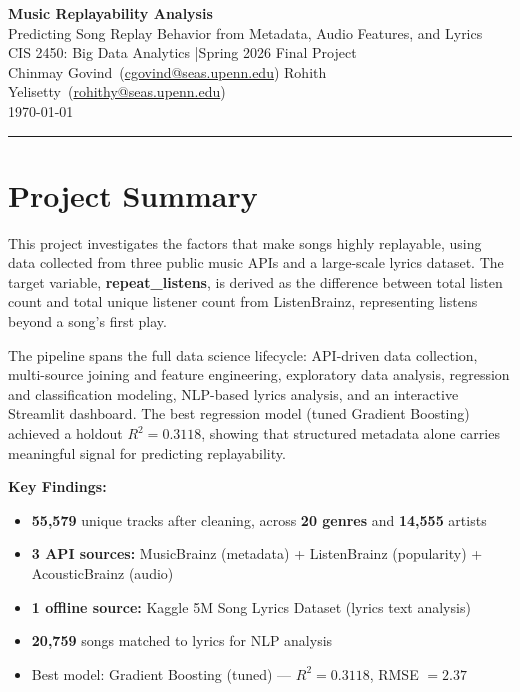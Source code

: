 \documentclass[11pt, letterpaper]{article}
\begin{document}
\begin{center}
    {\LARGE\bfseries\color{accent} Music Replayability Analysis}\\[0.5em]
    {\large Predicting Song Replay Behavior from Metadata, Audio Features, and Lyrics}\\[1em]
    {\normalsize CIS 2450: Big Data Analytics \quad|\quad Spring 2026 Final Project}\\[0.3em]
    {\normalsize Chinmay Govind\ (\href{mailto:cgovind@seas.upenn.edu}{cgovind@seas.upenn.edu}) \quad\textbullet\quad Rohith Yelisetty\ (\href{mailto:rohithy@seas.upenn.edu}{rohithy@seas.upenn.edu})}\\[0.5em]
    {\small \color{mutedgray}\today}
\end{center}

\vspace{0.5em}
\color{accent}\rule{\linewidth}{1pt}\color{black}
\vspace{1em}

\section{Project Summary}

This project investigates the factors that make songs highly replayable, using
data collected from three public music APIs and a large-scale lyrics dataset.
The target variable, \textbf{repeat\_listens}, is derived as the difference between
total listen count and total unique listener count from ListenBrainz,
representing listens beyond a song's first play.

The pipeline spans the full data science lifecycle: API-driven data collection,
multi-source joining and feature engineering, exploratory data analysis,
regression and classification modeling, NLP-based lyrics analysis, and an
interactive Streamlit dashboard. The best regression model (tuned Gradient
Boosting) achieved a holdout $R^2 = 0.3118$, showing that structured metadata
alone carries meaningful signal for predicting replayability.

\begin{infobox}
\textbf{Key Findings:}
\begin{itemize}[noitemsep, topsep=2pt]
    \item \textbf{55,579} unique tracks after cleaning, across \textbf{20 genres} and \textbf{14,555} artists
    \item \textbf{3 API sources:} MusicBrainz (metadata) + ListenBrainz (popularity) + AcousticBrainz (audio)
    \item \textbf{1 offline source:} Kaggle 5M Song Lyrics Dataset (lyrics text analysis)
    \item \textbf{20,759} songs matched to lyrics for NLP analysis
    \item Best model: Gradient Boosting (tuned) — $R^2 = 0.3118$, RMSE $= 2.37$
\end{itemize}
\end{infobox}
\end{document}
